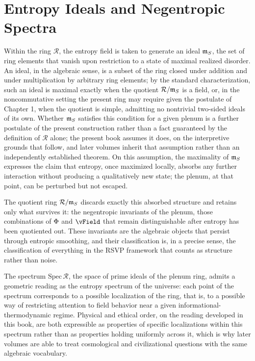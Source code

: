 \chapter{Entropy Ideals and Negentropic Spectra}

Within the ring $\mathcal{R}$, the entropy field is taken to generate an ideal $\mathfrak{m}_{S}$, the set of ring elements that vanish upon restriction to a state of maximal realized disorder. An ideal, in the algebraic sense, is a subset of the ring closed under addition and under multiplication by arbitrary ring elements; by the standard characterization, such an ideal is maximal exactly when the quotient $\mathcal{R}/\mathfrak{m}_{S}$ is a field, or, in the noncommutative setting the present ring may require given the postulate of Chapter 1, when the quotient is simple, admitting no nontrivial two-sided ideals of its own. Whether $\mathfrak{m}_{S}$ satisfies this condition for a given plenum is a further postulate of the present construction rather than a fact guaranteed by the definition of $\mathcal{R}$ alone; the present book assumes it does, on the interpretive grounds that follow, and later volumes inherit that assumption rather than an independently established theorem. On this assumption, the maximality of $\mathfrak{m}_{S}$ expresses the claim that entropy, once maximized locally, absorbs any further interaction without producing a qualitatively new state; the plenum, at that point, can be perturbed but not escaped.

The quotient ring $\mathcal{R} / \mathfrak{m}_{S}$ discards exactly this absorbed structure and retains only what survives it: the negentropic invariants of the plenum, those combinations of $\Phi$ and $\vField$ that remain distinguishable after entropy has been quotiented out. These invariants are the algebraic objects that persist through entropic smoothing, and their classification is, in a precise sense, the classification of everything in the RSVP framework that counts as structure rather than noise.

The spectrum $\mathrm{Spec}\,\mathcal{R}$, the space of prime ideals of the plenum ring, admits a geometric reading as the entropy spectrum of the universe: each point of the spectrum corresponds to a possible localization of the ring, that is, to a possible way of restricting attention to field behavior near a given informational-thermodynamic regime. Physical and ethical order, on the reading developed in this book, are both expressible as properties of specific localizations within this spectrum rather than as properties holding uniformly across it, which is why later volumes are able to treat cosmological and civilizational questions with the same algebraic vocabulary.


